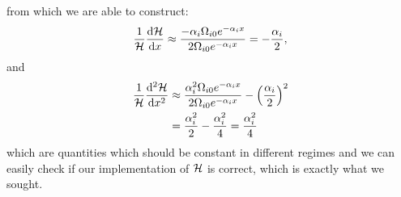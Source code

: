     from which we are able to construct:
    \begin{equation}
        \frac{1}{\mathcal{H}}\dv{\mathcal{H}}{x} \approx \frac{-\alpha_i\Omega_{i0}e^{-\alpha_ix}}{2\Omega_{i0}e^{-\alpha_ix}} = -\frac{\alpha_i}{2},
    \end{equation}
    and
    \begin{equation}
        \begin{split}
            \frac{1}{\mathcal{H}}\dv[2]{\mathcal{H}}{x} &\approx \frac{\alpha_i^2\Omega_{i0}e^{-\alpha_ix}}{2\Omega_{i0}e^{-\alpha_ix}} - \left(\frac{\alpha_i}{2}\right)^2 \\
            &= \frac{\alpha_i^2}{2} - \frac{\alpha_i^2}{4} = \frac{\alpha_i^2}{4}
        \end{split}
    \end{equation}
    which are quantities which should be constant in different regimes and we can easily check if our implementation of $\mathcal{H}$ is correct, which is exactly what we sought. 

